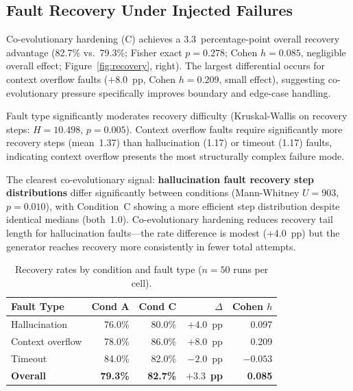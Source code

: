 \documentclass[11pt,letterpaper]{article}
\begin{document}
\subsection{Fault Recovery Under Injected Failures}

Co-evolutionary hardening (C) achieves a 3.3~percentage-point overall recovery
advantage (82.7\% vs.\ 79.3\%; Fisher exact $p = 0.278$; Cohen $h = 0.085$,
negligible overall effect; Figure~\ref{fig:recovery}, right). The largest
differential occurs for context overflow faults ($+8.0$~pp, Cohen $h = 0.209$,
small effect), suggesting co-evolutionary pressure specifically improves boundary
and edge-case handling.

Fault type significantly moderates recovery difficulty (Kruskal-Wallis on
recovery steps: $H = 10.498$, $p = 0.005$). Context overflow faults require
significantly more recovery steps (mean~1.37) than hallucination (1.17) or
timeout (1.17) faults, indicating context overflow presents the most
structurally complex failure mode.

The clearest co-evolutionary signal: \textbf{hallucination fault recovery step
distributions} differ significantly between conditions (Mann-Whitney $U = 903$,
$p = 0.010$), with Condition~C showing a more efficient step distribution despite
identical medians (both~1.0). Co-evolutionary hardening reduces recovery tail
length for hallucination faults---the rate difference is modest (+4.0~pp) but
the generator reaches recovery more consistently in fewer total attempts.

\begin{table}[htbp]
\centering
\caption{Recovery rates by condition and fault type ($n = 50$ runs per cell).}
\label{tab:recovery}
\begin{tabular}{@{}lrrrr@{}}
\toprule
\textbf{Fault Type} & \textbf{Cond A} & \textbf{Cond C}
                    & \textbf{$\Delta$} & \textbf{Cohen $h$} \\
\midrule
Hallucination    & 76.0\% & 80.0\% & $+4.0$~pp & 0.097  \\
Context overflow & 78.0\% & 86.0\% & $+8.0$~pp & 0.209  \\
Timeout          & 84.0\% & 82.0\% & $-2.0$~pp & $-0.053$ \\
\midrule
\textbf{Overall} & \textbf{79.3\%} & \textbf{82.7\%}
                 & $\mathbf{+3.3}$~\textbf{pp} & \textbf{0.085} \\
\bottomrule
\end{tabular}
\end{table}
\end{document}
